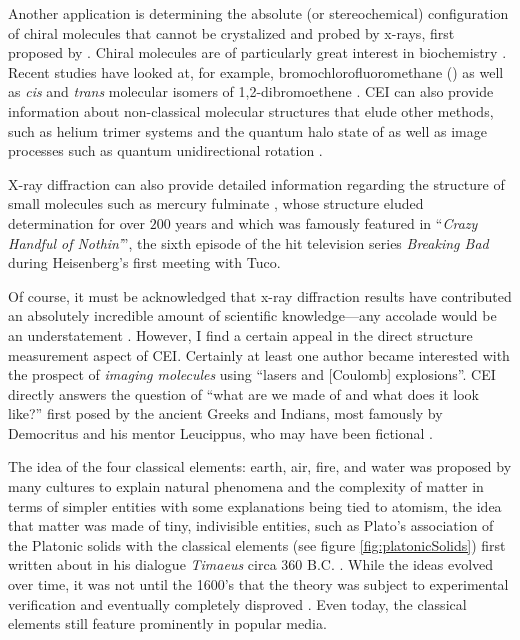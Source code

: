 Another application is determining the absolute (or stereochemical) configuration of chiral molecules that cannot be crystalized and probed by x-rays, first proposed by \citet{Kitamura01}. Chiral molecules are of particularly great interest in biochemistry \citep{Gardner05}. Recent studies have looked at, for example, bromochlorofluoromethane () \citep{Pitzer13} as well as \emph{cis} and \emph{trans} molecular isomers of 1,2-dibromoethene \citep{Ablikim16}. CEI can also provide information about non-classical molecular structures that elude other methods, such as helium trimer systems \citep{Voigtsberger14} and the quantum halo state of  \citep{Zeller16} as well as image processes such as quantum unidirectional rotation \citep{Mizuse15}.

X-ray diffraction can also provide detailed information regarding the structure of small molecules such as mercury fulminate \citep{Beck07}, whose structure eluded determination for over $200$ years and which was famously featured in ``\textit{Crazy Handful of Nothin'}'', the sixth episode of the hit television series \textit{Breaking Bad} during Heisenberg’s first meeting with Tuco.

Of course, it must be acknowledged that x-ray diffraction results have contributed an absolutely incredible amount of scientific knowledge---any accolade would be an understatement \citep{Hendrickson95}. However, I find a certain appeal in the direct structure measurement aspect of CEI. Certainly at least one author became interested with the prospect of \emph{imaging molecules} using ``lasers and [Coulomb] explosions''. CEI directly answers the question of ``what are we made of and what does it look like?'' first posed by the ancient Greeks and Indians, most famously by Democritus and his mentor Leucippus, who may have been fictional \citep{Taylor10}.

The idea of the four classical elements: earth, air, fire, and water was proposed by many cultures to explain natural phenomena and the complexity of matter in terms of simpler entities with some explanations being tied to atomism, the idea that matter was made of tiny, indivisible entities, such as Plato's association of the Platonic solids with the classical elements (see figure \ref{fig:platonicSolids}) first written about in his dialogue \textit{Timaeus} circa 360 B.C. \citep{Cornford14}. While the ideas evolved over time, it was not until the 1600's that the theory was subject to experimental verification and eventually completely disproved \citep{Maxwell1873}. Even today, the classical elements still feature prominently in popular media.

